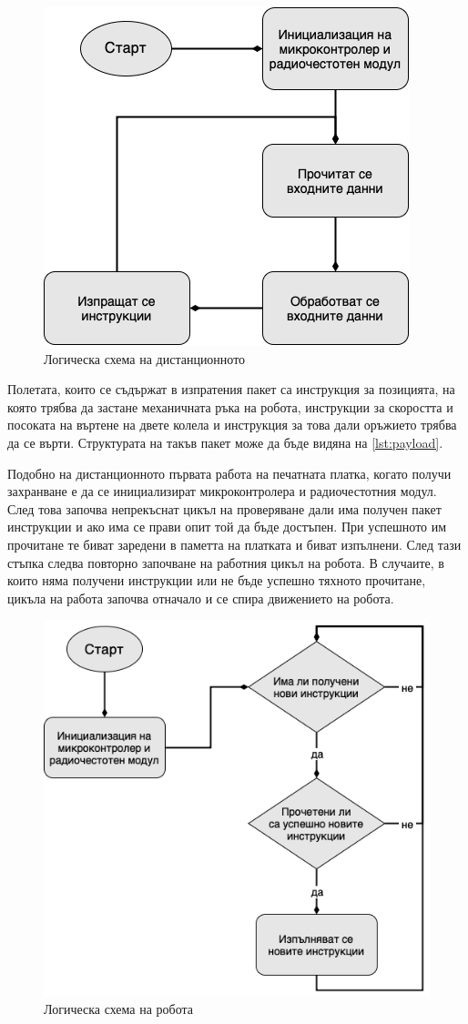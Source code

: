 \begin{figure}[H]
    \centering
    \includegraphics[width=0.6\linewidth]{images/logic-schema-controller.png}
    
    \caption{Логическа схема на дистанционното}
    \label{fig:logic-controller} 
\end{figure}

Полетата, които се съдържат в изпратения пакет са инструкция за позицията, на която трябва да застане механичната ръка на робота, инструкции за скоростта и посоката на въртене на двете колела и инструкция за това дали оръжието трябва да се върти. Структурата на такъв пакет може да бъде видяна на \autoref{lst:payload}.



Подобно на дистанционното първата работа на печатната платка, когато получи захранване е да се инициализират микроконтролера и радиочестотния модул. След това започва непрекъснат цикъл на проверяване дали има получен пакет инструкции и ако има се прави опит той да бъде достъпен. При успешното им прочитане те биват заредени в паметта на платката и биват изпълнени. След тази стъпка следва повторно започване на работния цикъл на робота. В случаите, в които няма получени инструкции или не бъде успешно тяхното прочитане, цикъла на работа започва отначало и се спира движението на робота.

\begin{figure}[H]
    \centering
    \includegraphics[width=0.6\linewidth]{images/logic-schema-robot.png}
    
    \caption{Логическа схема на робота}
    \label{fig:logic-robot} 
\end{figure}


